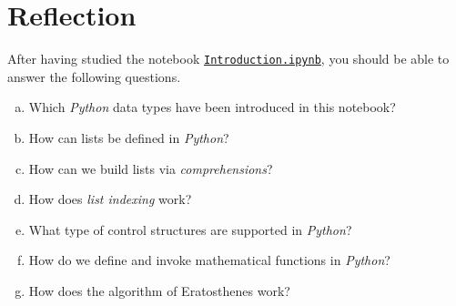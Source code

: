 \section{Reflection}
After having studied the notebook
\href{https://github.com/karlstroetmann/Algorithms/blob/master/Python/Chapter-02/Introduction.ipynb}{\texttt{Introduction.ipynb}}, you should be able to answer the following questions.
\begin{enumerate}[(a)]
\item Which \textsl{Python} data types have been introduced in this notebook?
\item How can lists be defined in \textsl{Python}?
\item How can we build lists via \emph{comprehensions}? 
\item How does \emph{list indexing} work?
\item What type of control structures are supported in \textsl{Python}?
\item How do we define and invoke mathematical functions in \textsl{Python}?
\item How does the algorithm of Eratosthenes work?  
\end{enumerate}


